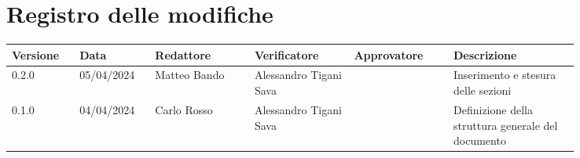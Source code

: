 \section*{Registro delle modifiche}
 {
  \scriptsize
  \begin{tabular}{p{0.10\linewidth}p{0.10\linewidth}p{0.15\linewidth}p{0.15\linewidth}p{0.15\linewidth}p{0.19\linewidth}}
	  \textbf{Versione} & \textbf{Data} & \textbf{Redattore}     & \textbf{Verificatore} & \textbf{Approvatore} & \textbf{Descrizione}                                                                                             \\
	  \hline
	  0.2.0             & 05/04/2024    & Matteo Bando & Alessandro Tigani Sava               &               & Inserimento e stesura delle sezioni \\ 
	  \hline
	  0.1.0             & 04/04/2024    & Carlo Rosso & Alessandro Tigani Sava               &               & Definizione della struttura generale del documento \\
	\hline
	\end{tabular}
 }
